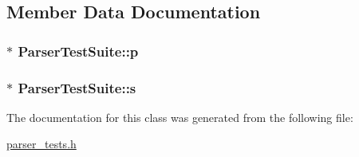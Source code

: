 \subsection{Member Data Documentation}
\hypertarget{classParserTestSuite_a1d637f2f8be1326423ee5b4fd270c553}{
\subsubsection[{p}]{$\ast$ Parser\-Test\-Suite\-::p}}\label{classParserTestSuite_a1d637f2f8be1326423ee5b4fd270c553}
\hypertarget{classParserTestSuite_a0c4943b3d23b79be363ba9e1ac7c02ed}{
\subsubsection[{s}]{$\ast$ Parser\-Test\-Suite\-::s}}\label{classParserTestSuite_a0c4943b3d23b79be363ba9e1ac7c02ed}


The documentation for this class was generated from the following file\-:\begin{DoxyCompactItemize}
\item 
\hyperlink{parser__tests_8h}{parser\-\_\-tests.\-h}\end{DoxyCompactItemize}
